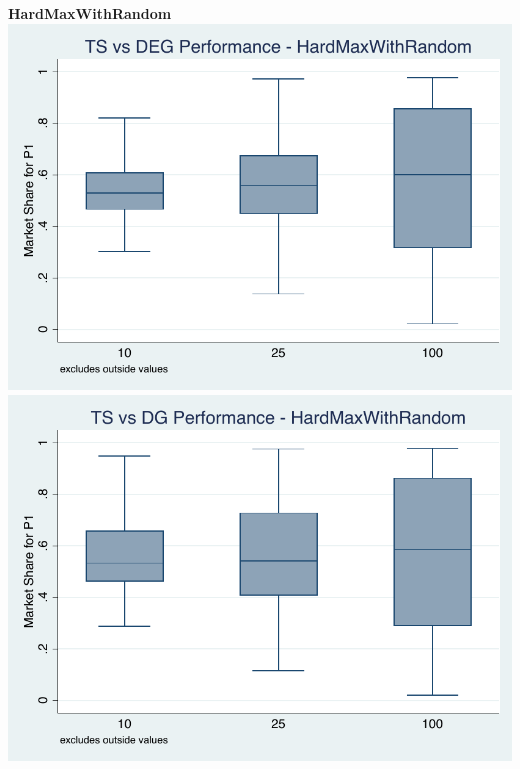 \documentclass[11pt,letterpaper]{article}
\begin{document}
\pagebreak
\textbf{HardMaxWithRandom} \\
\includegraphics[scale=1]{hmr_ts_deg} \\
\includegraphics[scale=1]{hmr_ts_dg}
\end{document}
